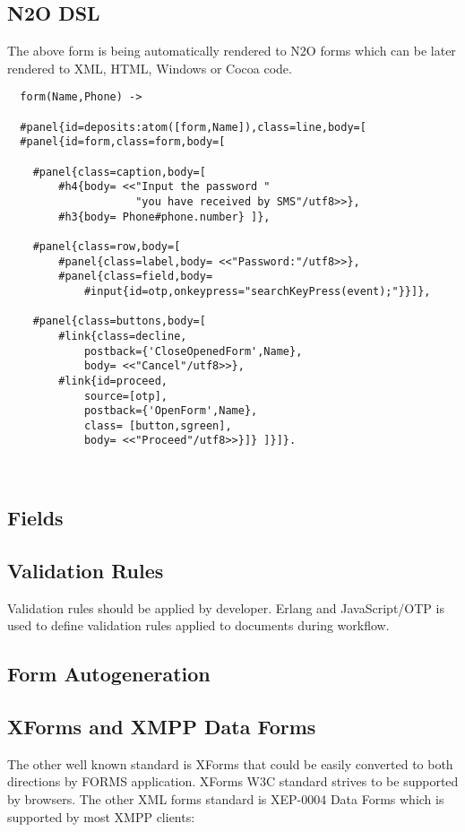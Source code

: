 \newpage
\subsection{N2O DSL}
The above form is being automatically rendered to N2O forms which can be
later rendered to XML, HTML, Windows or Cocoa code.

\vspace{1\baselineskip}
\begin{lstlisting}
  form(Name,Phone) ->

  #panel{id=deposits:atom([form,Name]),class=line,body=[
  #panel{id=form,class=form,body=[

    #panel{class=caption,body=[
        #h4{body= <<"Input the password "
                    "you have received by SMS"/utf8>>},
        #h3{body= Phone#phone.number} ]},

    #panel{class=row,body=[
        #panel{class=label,body= <<"Password:"/utf8>>},
        #panel{class=field,body=
            #input{id=otp,onkeypress="searchKeyPress(event);"}}]},

    #panel{class=buttons,body=[
        #link{class=decline,
            postback={'CloseOpenedForm',Name},
            body= <<"Cancel"/utf8>>},
        #link{id=proceed,
            source=[otp],
            postback={'OpenForm',Name},
            class= [button,sgreen],
            body= <<"Proceed"/utf8>>}]} ]}]}.
\end{lstlisting}

\

\subsection{Fields}

\subsection{Validation Rules}
Validation rules should be applied by developer.
Erlang and JavaScript/OTP is used to define validation
rules applied to documents during workflow.

\subsection{Form Autogeneration}

\subsection*{XForms and XMPP Data Forms}
The other well known standard is XForms that could be easily converted
to both directions by FORMS application. XForms W3C standard strives to be supported by browsers.
The other XML forms standard is XEP-0004 Data Forms which is supported by most XMPP clients:


